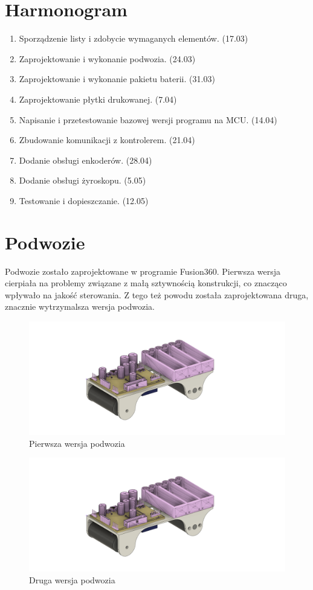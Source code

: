 \documentclass[10pt, a4paper]{article}
\begin{document}
\section{Harmonogram}
\begin{enumerate}
	\item Sporządzenie listy i zdobycie wymaganych elementów. (17.03)
	\item Zaprojektowanie i wykonanie podwozia. (24.03)
	\item Zaprojektowanie i wykonanie pakietu baterii. (31.03)
	\item Zaprojektowanie płytki drukowanej. (7.04)
	\item Napisanie i przetestowanie bazowej wersji programu na MCU. (14.04)
	\item Zbudowanie komunikacji z kontrolerem. (21.04)
	\item Dodanie obsługi enkoderów. (28.04)
	\item Dodanie obsługi żyroskopu. (5.05)
	\item Testowanie i dopieszczanie. (12.05)
\end{enumerate}


\section{Podwozie}
Podwozie zostało zaprojektowane w programie Fusion360. 
Pierwsza wersja cierpiała na problemy związane z małą sztywnością 
konstrukcji, co znacząco wpływało na jakość sterowania. 
Z tego też powodu została zaprojektowana druga, znacznie wytrzymalsza
wersja podwozia.

\begin{figure}[H]
	\centering
	\includegraphics[width=1\textwidth]{figures/chassisV1.png}
	\caption{Pierwsza wersja podwozia}
	\label{fig:chassisv1}
\end{figure}

\begin{figure}[H]
	\centering
	\includegraphics[width=1\textwidth]{figures/chassisV1.png}
	\caption{Druga wersja podwozia}
	\label{fig:chassisv2}
\end{figure}
\end{document}
